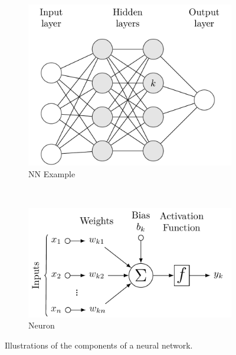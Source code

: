 
\begin{figure}[H]
  \centering
  \begin{subfigure}[b]{0.48\textwidth}\centering
      \includegraphics[width=\textwidth]{figures/ml/NN_diagram/NN_diagram}
  \caption{NN Example}
  \label{fig:NN:ex}
  \end{subfigure}
  ~
  \begin{subfigure}[b]{0.48\textwidth}\centering
      \includegraphics[width=\textwidth]{figures/ml/NN_neuron/NN_neuron}
  \caption{Neuron}
  \label{fig:NN:Neuron}
  \end{subfigure}
\caption{
Illustrations of the components of a neural network.
\label{fig:NN}
}
\end{figure}


